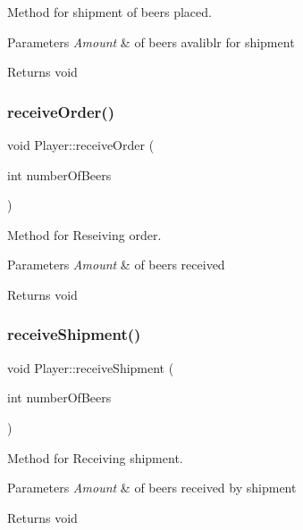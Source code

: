 Method for shipment of beers placed. 


\begin{DoxyParams}{Parameters}
{\em Amount} & of beers avaliblr for shipment \\
\hline
\end{DoxyParams}
\begin{DoxyReturn}{Returns}
void 
\end{DoxyReturn}
\mbox{\label{classPlayer_af0df6a78d154f85b72869044a91adcf3}} 
\subsubsection{\texorpdfstring{receive\+Order()}{receiveOrder()}}
{\footnotesize\ttfamily void Player\+::receive\+Order (\begin{DoxyParamCaption}\item[{int}]{number\+Of\+Beers }\end{DoxyParamCaption})}



Method for Reseiving order. 


\begin{DoxyParams}{Parameters}
{\em Amount} & of beers received \\
\hline
\end{DoxyParams}
\begin{DoxyReturn}{Returns}
void 
\end{DoxyReturn}
\mbox{\label{classPlayer_ae1a59b99f054470c0e2fde589a29a559}} 
\subsubsection{\texorpdfstring{receive\+Shipment()}{receiveShipment()}}
{\footnotesize\ttfamily void Player\+::receive\+Shipment (\begin{DoxyParamCaption}\item[{int}]{number\+Of\+Beers }\end{DoxyParamCaption})}



Method for Receiving shipment. 


\begin{DoxyParams}{Parameters}
{\em Amount} & of beers received by shipment \\
\hline
\end{DoxyParams}
\begin{DoxyReturn}{Returns}
void 
\end{DoxyReturn}
\mbox{\label{classPlayer_a131897406c5504012015860b5de606f0}} 
